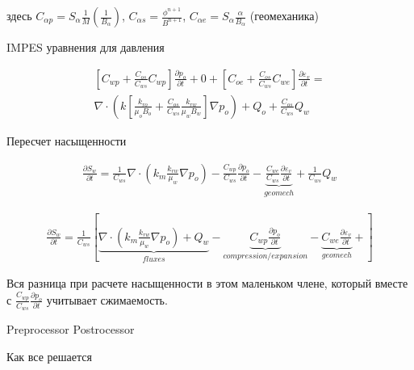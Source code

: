 \documentclass[14pt]{article}
\begin{document}
	здесь $C_{\alpha p} = S_{\alpha} \frac{1}{M} (\frac{1}{B_{\alpha}})$, $C_{\alpha s} = \frac{\phi^{n+1}}{B^{n+1}}$, $C_{\alpha e} = S_{\alpha} \frac{\alpha}{B_{\alpha}} $ (геомеханика)
	
	IMPES уравнения для давления
	
	\begin{eqnarray}
		\left[ C_{wp} + \frac{C_{os}}{C_{ws}} C_{wp} \right] \frac{\partial p_{o}}{\partial t} + 
		0 + 
		\left[C_{oe} + \frac{C_{os}}{C_{ws}} C_{we} \right] \frac{\partial \varepsilon_{v}}{\partial t} = \\
		\nabla \cdot \left( k \left[ \frac{k_{ro}}{\mu_{o} B_{o}} + \frac{C_{os}}{C_{ws}} \frac{k_{rw}}{\mu_{w} B_{w}} \right] \nabla p_{o} \right) + 
		Q_{o} + \frac{C_{os}}{C_{ws}} Q_{w}
	\end{eqnarray}
	
	Пересчет насыщенности
	
	\begin{eqnarray}
		 \frac{\partial S_{w}}{\partial t} =
		\frac{1}{C_{ws}} \nabla \cdot \left( k_{m} \frac{k_{rw}}{\mu_{w}} \nabla p_{o} \right) - 
		\frac{C_{wp}}{C_{ws}} \frac{\partial p_{o}}{\partial t} -
		\underbrace{ \frac{C_{we}}{C_{ws}} \frac{\partial \varepsilon_{v}}{\partial t} }_{geomech} +
		\frac{1}{C_{ws}} Q_{w}
	\end{eqnarray}
	
	\begin{eqnarray}
		\frac{\partial S_{w}}{\partial t} =
		\frac{1}{C_{ws}}  \left[ 
		\underbrace{ \nabla \cdot \left( k_{m} \frac{k_{rw}}{\mu_{w}} \nabla p_{o} \right) + 
	 	Q_{w} }_{fluxes} - 
		\underbrace{ C_{wp} \frac{\partial p_{o}}{\partial t} }_{compression/expansion} -
		\underbrace{ C_{we} \frac{\partial \varepsilon_{v}}{\partial t} }_{geomech} +
		 \right]
	\end{eqnarray}
	
	Вся разница при расчете насыщенности в этом маленьком члене, который вместе с $\frac{C_{wp}}{C_{ws}} \frac{\partial p_{o}}{\partial t}$ учитывает сжимаемость. 

\newpage

\begin{algorithm}[H]
	\SetAlgoLined
	
	Preprocessor\;
	Postrocessor\;
	\caption{Как все решается}
\end{algorithm}
\end{document}
